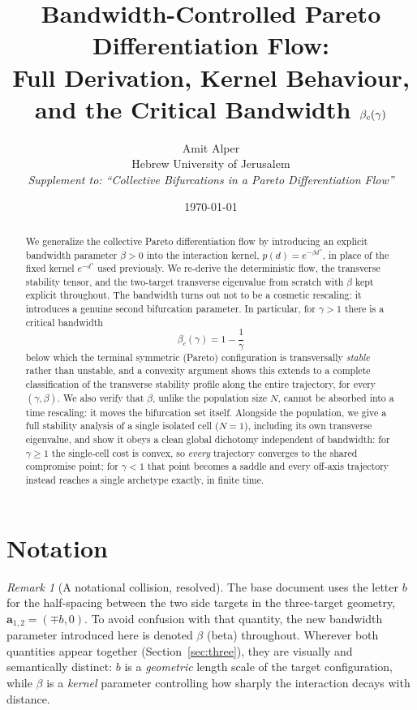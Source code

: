 \documentclass[11pt,a4paper]{article}
\title{\bfseries
Bandwidth-Controlled Pareto Differentiation Flow:\\
Full Derivation, Kernel Behaviour, and the Critical Bandwidth $\bwc(\gamma)$
}
\author{Amit Alper\\
\small Hebrew University of Jerusalem\\[2pt]
\small \emph{Supplement to: ``Collective Bifurcations in a Pareto Differentiation Flow''}}
\date{\today}
\theoremstyle{plain}
\theoremstyle{definition}
\theoremstyle{remark}
\newtheorem{remark}[theorem]{Remark}
\newcommand{\ba}{\bm{a}}
\newcommand{\bw}{\beta}
\newcommand{\bwc}{\beta_c}
\begin{document}
\maketitle

\begin{abstract}
We generalize the collective Pareto differentiation flow by introducing an
explicit bandwidth parameter $\bw>0$ into the interaction kernel,
$p(d)=e^{-\bw d^{\gamma}}$, in place of the fixed kernel $e^{-d^\gamma}$ used
previously. We re-derive the deterministic flow, the transverse stability
tensor, and the two-target transverse eigenvalue from scratch with $\bw$ kept
explicit throughout. The bandwidth turns out not to be a cosmetic rescaling:
it introduces a genuine second bifurcation parameter. In particular, for
$\gamma>1$ there is a critical bandwidth
\[
  \bwc(\gamma)=1-\frac{1}{\gamma}
\]
below which the terminal symmetric (Pareto) configuration is transversally
\emph{stable} rather than unstable, and a convexity argument shows this
extends to a complete classification of the transverse stability profile
along the entire trajectory, for every $(\gamma,\bw)$. We also verify that
$\bw$, unlike the population size $N$, cannot be absorbed into a time
rescaling: it moves the bifurcation set itself. Alongside the population,
we give a full stability analysis of a single isolated cell ($N=1$),
including its own transverse eigenvalue, and show it obeys a clean global
dichotomy independent of bandwidth: for $\gamma\ge1$ the single-cell cost is
convex, so \emph{every} trajectory converges to the shared compromise point;
for $\gamma<1$ that point becomes a saddle and every off-axis trajectory
instead reaches a single archetype exactly, in finite time.
\end{abstract}

\tableofcontents

\section{Notation}
\label{sec:notation}

\begin{remark}[A notational collision, resolved]
The base document uses the letter $b$ for the half-spacing between the two
side targets in the three-target geometry, $\ba_{1,2}=(\mp b,0)$. To avoid
confusion with that quantity, the new bandwidth parameter introduced here is
denoted $\bw$ (beta) throughout. Wherever both quantities appear together
(Section~\ref{sec:three}), they are visually and semantically distinct:
$b$ is a \emph{geometric} length scale of the target configuration, while
$\bw$ is a \emph{kernel} parameter controlling how sharply the interaction
decays with distance.
\end{remark}
\end{document}
